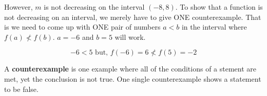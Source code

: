 \documentclass{ximera}
\begin{document}
\begin{example}
However, $m$ is not decreasing on the interval $(-8, 8)$.  To show that a function is not decreasing on an interval, we merely have to give ONE counterexample. That is we need to come up with ONE pair of numbers $a < b$ in the interval where $f(a) \nless f(b)$.  $a = -6$ and $b = 5$ will work.

\[ -6 < 5    \text{ but, }   f(-6) = 6  \nless f(5) = -2 \]




\end{example}


A \textbf{counterexample} is one example where all of the conditions of a stement are met, yet the conclusion is not true.  One single  counterexample shows a statement to be false.
\end{document}
